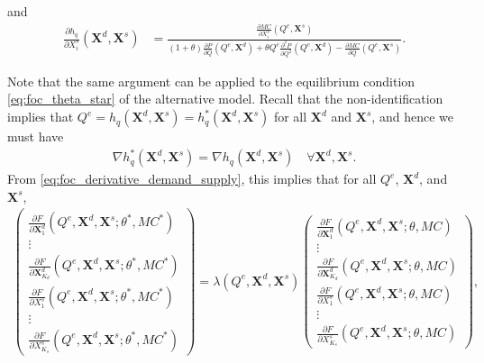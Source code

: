 \documentclass[11pt, a4paper]{article}
\begin{document}
and
\begin{align}
    \frac{\partial h_q}{\partial X^{s}_{i}}(\bm{X}^{d}, \bm{X}^{s}) & = \frac{\frac{\partial MC}{\partial X^{s}_{i}}(Q^e, \bm{X}^{s})}{(1+\theta)\frac{\partial P}{\partial Q}(Q^e, \bm{X}^{d}) + \theta  Q^e\frac{\partial^2 P}{\partial Q^2}(Q^e, \bm{X}^{d}) - \frac{\partial MC}{\partial Q}(Q^e, \bm{X}^{s})}. \label{eq:foc_derivative_supply}
\end{align}

Note that the same argument can be applied to the equilibrium condition \eqref{eq:foc_theta_star} of the alternative model.
Recall that the non-identification implies that $Q^e = h_q(\bm{X}^{d}, \bm{X}^{s}) = h_q^{*}(\bm{X}^{d}, \bm{X}^{s})$ for all $\bm{X}^{d}$ and $\bm{X}^{s}$, and hence we must have
\begin{align}
    \nabla h_q^{*}(\bm{X}^{d}, \bm{X}^{s}) = \nabla h_q(\bm{X}^{d}, \bm{X}^{s}) \quad \forall \bm{X}^{d}, \bm{X}^{s}. \label{eq:observale_equivalence_derivative}
\end{align}
From \eqref{eq:foc_derivative_demand_supply}, this implies that for all $Q^e$, $\bm{X}^{d}$, and $\bm{X}^{s}$,
\begin{align}
    \begin{pmatrix}
        \frac{\partial F}{\partial \bm{X}^{d}_{1}}(Q^e, \bm{X}^{d}, \bm{X}^{s}; \theta^{*}, MC^{*})\\
        \vdots \\
        \frac{\partial F}{\partial \bm{X}^{d}_{K_d}}(Q^e, \bm{X}^{d}, \bm{X}^{s}; \theta^{*}, MC^{*})\\
        \frac{\partial F}{\partial X^{s}_{1}}(Q^e, \bm{X}^{d}, \bm{X}^{s}; \theta^{*}, MC^{*})\\
        \vdots \\
        \frac{\partial F}{\partial X^{s}_{K_s}}(Q^e, \bm{X}^{d}, \bm{X}^{s}; \theta^{*}, MC^{*})
    \end{pmatrix}
    = \lambda(Q^e, \bm{X}^{d}, \bm{X}^{s})
    \begin{pmatrix}
        \frac{\partial F}{\partial \bm{X}^{d}_{1}}(Q^e, \bm{X}^{d}, \bm{X}^{s}; \theta, MC)\\
        \vdots \\
        \frac{\partial F}{\partial \bm{X}^{d}_{K_d}}(Q^e, \bm{X}^{d}, \bm{X}^{s}; \theta, MC)\\
        \frac{\partial F}{\partial X^{s}_{1}}(Q^e, \bm{X}^{d}, \bm{X}^{s}; \theta, MC)\\
        \vdots \\
        \frac{\partial F}{\partial X^{s}_{K_s}}(Q^e, \bm{X}^{d}, \bm{X}^{s}; \theta, MC)
    \end{pmatrix},\label{eq:foc_derivative_demand_supply_lambda}
\end{align}
\end{document}
